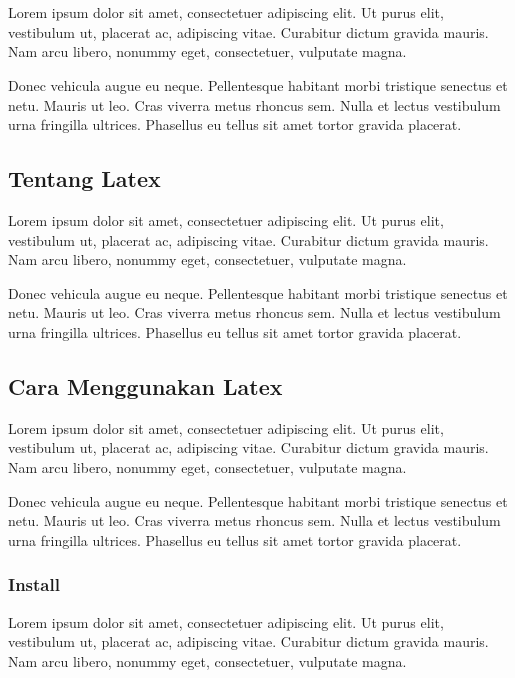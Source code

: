 \chapter{\babSatu}
Lorem ipsum dolor sit amet, consectetuer adipiscing elit.
Ut purus elit, vestibulum ut, placerat ac, adipiscing vitae.
Curabitur dictum gravida mauris.
Nam arcu libero, nonummy eget, consectetuer, vulputate magna.

Donec vehicula augue eu neque.
Pellentesque habitant morbi tristique senectus et netu.
Mauris ut leo.  Cras viverra metus rhoncus sem.
Nulla et lectus vestibulum urna fringilla ultrices.
Phasellus eu tellus sit amet tortor gravida placerat.

\section{Tentang Latex}

Lorem ipsum dolor sit amet, consectetuer adipiscing elit.
Ut purus elit, vestibulum ut, placerat ac, adipiscing vitae.
Curabitur dictum gravida mauris.
Nam arcu libero, nonummy eget, consectetuer, vulputate magna.

Donec vehicula augue eu neque.
Pellentesque habitant morbi tristique senectus et netu.
Mauris ut leo.  Cras viverra metus rhoncus sem.
Nulla et lectus vestibulum urna fringilla ultrices.
Phasellus eu tellus sit amet tortor gravida placerat.

\section{Cara Menggunakan Latex}

Lorem ipsum dolor sit amet, consectetuer adipiscing elit.
Ut purus elit, vestibulum ut, placerat ac, adipiscing vitae.
Curabitur dictum gravida mauris.
Nam arcu libero, nonummy eget, consectetuer, vulputate magna.

Donec vehicula augue eu neque.
Pellentesque habitant morbi tristique senectus et netu.
Mauris ut leo.  Cras viverra metus rhoncus sem.
Nulla et lectus vestibulum urna fringilla ultrices.
Phasellus eu tellus sit amet tortor gravida placerat.

\subsection{Install}

Lorem ipsum dolor sit amet, consectetuer adipiscing elit.
Ut purus elit, vestibulum ut, placerat ac, adipiscing vitae.
Curabitur dictum gravida mauris.
Nam arcu libero, nonummy eget, consectetuer, vulputate magna.

